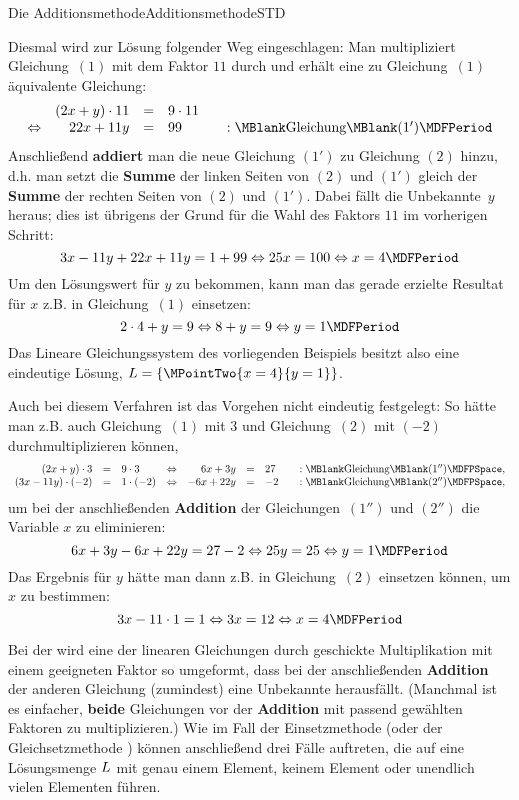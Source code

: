 \begin{MXContent}{Die Additionsmethode}{Additionsmethode}{STD}
\begin{MExample}
Diesmal wird zur Lösung folgender Weg eingeschlagen: Man multipliziert Gleichung~$(1)$ mit dem Faktor $11$ durch und
erhält eine zu Gleichung~$(1)$ äquivalente Gleichung:
$$\begin{array}{crclcl} & (2 x + y) \cdot 11 & = & 9 \cdot 11 & & \\
\Leftrightarrow & 22 x + 11 y & = & 99 & & : \MBlank\mbox{Gleichung}\MBlank (1') 
\MDFPeriod \end{array}$$
Anschließend \textbf{addiert} man die neue Gleichung $(1')$ zu Gleichung $(2)$ hinzu, d.h. man setzt die
\textbf{Summe} der linken Seiten von $(2)$ und $(1')$ gleich der \textbf{Summe} der rechten Seiten
von $(2)$ und $(1')$. Dabei fällt die Unbekannte~$y$
heraus; dies ist übrigens der Grund für die Wahl des Faktors $11$ im vorherigen Schritt:
$$3 x - 11 y + 22 x + 11 y = 1 + 99 \Leftrightarrow 25 x = 100 \Leftrightarrow x = 4 \MDFPeriod $$
Um den Lösungswert für $y$ zu bekommen, kann man das gerade erzielte Resultat für $x$ z.B. in Gleichung~$(1)$
einsetzen:
$$2 \cdot 4 + y = 9 \Leftrightarrow 8 + y = 9 \Leftrightarrow y = 1 \MDFPeriod$$
Das Lineare Gleichungssystem des vorliegenden Beispiels besitzt also eine eindeutige Lösung, ${\ML} =
\{ \MPointTwo{x = 4}{y = 1} \}$.
\end{MExample}
Auch bei diesem Verfahren ist das Vorgehen nicht eindeutig festgelegt: So hätte man z.B. auch Gleichung~$(1)$ mit $3$
und Gleichung~$(2)$ mit $(- 2)$ durchmultiplizieren können,
$$\begin{array}{rclcrclcl} (2x + y) \cdot 3 & = & 9 \cdot 3 & \Leftrightarrow & 6 x + 3 y & = & 27
& & : \MBlank\mbox{Gleichung}\MBlank ({1''}) \MDFPSpace, \\ 
(3 x - 11 y) \cdot (- 2) & = & 1 \cdot (- 2) & \Leftrightarrow & - 6 x + 22 y & = & - 2
& & : \MBlank\mbox{Gleichung}\MBlank ({2''}) \MDFPSpace , \end{array}$$
um bei der anschließenden \textbf{Addition} der Gleichungen~$({1''})$ und $({2''})$ die Variable $x$ zu eliminieren:
$$6 x + 3 y - 6 x + 22 y = 27 - 2 \Leftrightarrow 25 y = 25 \Leftrightarrow y = 1 \MDFPeriod$$
Das Ergebnis für $y$ hätte man dann z.B. in Gleichung~$(2)$ einsetzen können, um $x$ zu bestimmen:
$$3 x - 11 \cdot 1 = 1 \Leftrightarrow 3 x = 12 \Leftrightarrow x = 4 \MDFPeriod$$
\begin{MInfo}
Bei der  wird eine der linearen Gleichungen durch geschickte Multiplikation
mit einem geeigneten Faktor so umgeformt, dass bei der anschließenden \textbf{Addition} der anderen Gleichung (zumindest)
eine Unbekannte herausfällt. (Manchmal ist es einfacher, \textbf{beide} Gleichungen vor der \textbf{Addition} mit
passend gewählten Faktoren zu multiplizieren.) Wie im Fall der Einsetzmethode
 (oder der Gleichsetzmethode ) können%
anschließend drei Fälle auftreten, die auf eine Lösungsmenge $L$ mit genau einem Element, keinem Element oder
unendlich vielen Elementen führen.
\end{MInfo}
\end{MXContent}

